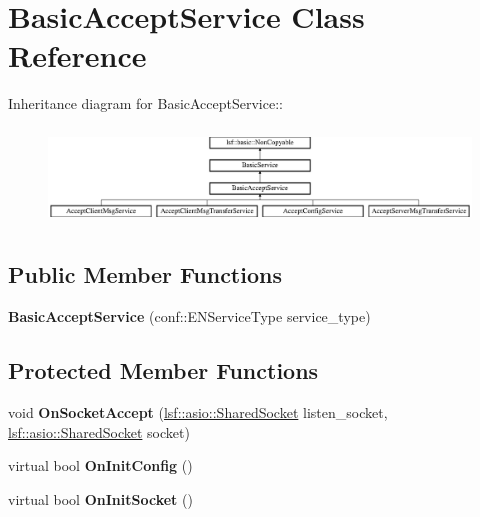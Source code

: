 \hypertarget{classBasicAcceptService}{
\section{BasicAcceptService Class Reference}
\label{classBasicAcceptService}
}
Inheritance diagram for BasicAcceptService::\begin{figure}[H]
\begin{center}
\leavevmode
\includegraphics[height=2.60465cm]{classBasicAcceptService}
\end{center}
\end{figure}
\subsection*{Public Member Functions}
\begin{DoxyCompactItemize}
\item 
\hypertarget{classBasicAcceptService_a956848a5898cf81c8de6325d614e130e}{
{\bfseries BasicAcceptService} (conf::ENServiceType service\_\-type)}
\label{classBasicAcceptService_a956848a5898cf81c8de6325d614e130e}

\end{DoxyCompactItemize}
\subsection*{Protected Member Functions}
\begin{DoxyCompactItemize}
\item 
\hypertarget{classBasicAcceptService_a48a34f012a8879ccfef73f014f43cebe}{
void {\bfseries OnSocketAccept} (\hyperlink{classlsf_1_1asio_1_1SharedSocket}{lsf::asio::SharedSocket} listen\_\-socket, \hyperlink{classlsf_1_1asio_1_1SharedSocket}{lsf::asio::SharedSocket} socket)}
\label{classBasicAcceptService_a48a34f012a8879ccfef73f014f43cebe}

\item 
\hypertarget{classBasicAcceptService_a597543a68aa83e5195f9bb3bd2d39513}{
virtual bool {\bfseries OnInitConfig} ()}
\label{classBasicAcceptService_a597543a68aa83e5195f9bb3bd2d39513}

\item 
\hypertarget{classBasicAcceptService_ac430e1bf636b3acb179ba214f594801e}{
virtual bool {\bfseries OnInitSocket} ()}
\label{classBasicAcceptService_ac430e1bf636b3acb179ba214f594801e}

\end{DoxyCompactItemize}
